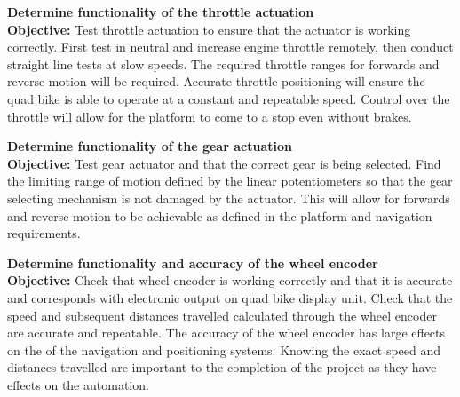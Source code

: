 \documentclass[main.tex]{subfiles}
\begin{document}
\begin{appendices}
\begin{qb}
\end{qb}

\begin{qb}
\textbf{Determine functionality of the throttle actuation}\\
\textbf{Objective:} Test throttle actuation to ensure that the actuator is working correctly. First test in neutral and increase engine throttle remotely, then conduct straight line tests at slow speeds. The required throttle ranges for forwards and reverse motion will be required. Accurate throttle positioning will ensure the quad bike is able to operate at a constant and repeatable speed. Control over the throttle will allow for the platform to come to a stop even without brakes.

\end{qb}

\begin{qb}
\textbf{Determine functionality of the gear actuation}\\
\textbf{Objective:} Test gear actuator and that the  correct gear is being selected. Find the limiting range of motion defined by the linear potentiometers so that the gear selecting mechanism is not damaged by the actuator. This will allow for forwards and reverse motion to be achievable as defined in the platform and navigation requirements.  

\end{qb}


\begin{qb}
\textbf{Determine functionality and accuracy of the wheel encoder}\\
\textbf{Objective:} Check that wheel encoder is working correctly and that it is accurate and corresponds with electronic output on quad bike display unit. Check that the speed and subsequent distances travelled calculated through the wheel encoder are accurate and repeatable. The accuracy of the wheel encoder has large effects on the of the navigation and positioning systems. Knowing the exact speed and distances travelled are important to the completion of the project as they have effects on the automation. 

\end{qb}



\end{appendices}
\end{document}
